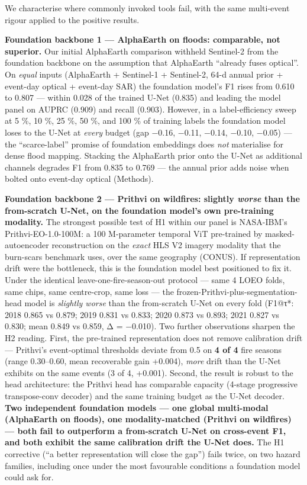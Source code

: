 We characterise where commonly invoked tools fail, with the same multi-event
rigour applied to the positive results.

\textbf{Foundation backbone 1 --- AlphaEarth on floods: comparable, not
superior.} Our initial AlphaEarth comparison withheld Sentinel-2 from
the foundation backbone on the assumption that AlphaEarth ``already fuses
optical''. On \emph{equal} inputs (AlphaEarth + Sentinel-1 + Sentinel-2, 64-d
annual prior + event-day optical + event-day SAR) the foundation model's
F1 rises from 0.610 to 0.807 --- within 0.028 of the trained U-Net (0.835)
and leading the model panel on AUPRC (0.909) and recall (0.903).
However, in a label-efficiency sweep at 5 \%, 10 \%, 25 \%, 50 \%, and 100 \%
of training labels the foundation model loses to the U-Net at \emph{every}
budget (gap −0.16, −0.11, −0.14, −0.10, −0.05) --- the ``scarce-label''
promise of foundation embeddings does \emph{not} materialise for dense flood
mapping. Stacking the AlphaEarth prior onto the U-Net as additional
channels degrades F1 from 0.835 to 0.769 --- the annual prior adds noise
when bolted onto event-day optical (Methods).

\textbf{Foundation backbone 2 --- Prithvi on wildfires: slightly \emph{worse} than
the from-scratch U-Net, on the foundation model's own pre-training
modality.} The strongest possible test of H1 within our panel is
NASA-IBM's Prithvi-EO-1.0-100M: a 100 M-parameter temporal ViT
pre-trained by masked-autoencoder reconstruction on the \emph{exact} HLS V2
imagery modality that the burn-scars benchmark uses, over the same
geography (CONUS). If representation drift were the bottleneck, this is
the foundation model best positioned to fix it. Under the identical
leave-one-fire-season-out protocol --- same 4 LOEO folds, same chips,
same centre-crop, same loss --- the frozen-Prithvi-plus-segmentation-head
model is \emph{slightly worse} than the from-scratch U-Net on every fold
(F1@τ*: 2018 0.865 vs 0.879; 2019 0.831 vs 0.833; 2020 0.873 vs 0.893;
2021 0.827 vs 0.830; mean 0.849 vs 0.859, Δ = −0.010). Two further
observations sharpen the H2 reading. First, the pre-trained
representation does not remove calibration drift --- Prithvi's
event-optimal thresholds deviate from 0.5 on \textbf{4 of 4} fire seasons
(range 0.30--0.60, mean recoverable gain +0.004), \emph{more} drift than the
U-Net exhibits on the same events (3 of 4, +0.001). Second, the result
is robust to the head architecture: the Prithvi head has comparable
capacity (4-stage progressive transpose-conv decoder) and the same
training budget as the U-Net decoder. \textbf{Two independent foundation
models --- one global multi-modal (AlphaEarth on floods), one
modality-matched (Prithvi on wildfires) --- both fail to outperform a
from-scratch U-Net on cross-event F1, and both exhibit the same
calibration drift the U-Net does.} The H1 corrective (``a better
representation will close the gap'') fails twice, on two hazard
families, including once under the most favourable conditions a
foundation model could ask for.

